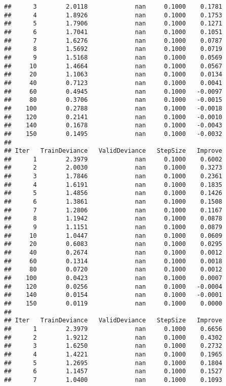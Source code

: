 \documentclass[]{article}
\begin{document}
\begin{verbatim}
##      3        2.0118             nan     0.1000    0.1781
##      4        1.8926             nan     0.1000    0.1753
##      5        1.7906             nan     0.1000    0.1271
##      6        1.7041             nan     0.1000    0.1051
##      7        1.6276             nan     0.1000    0.0787
##      8        1.5692             nan     0.1000    0.0719
##      9        1.5168             nan     0.1000    0.0569
##     10        1.4664             nan     0.1000    0.0567
##     20        1.1063             nan     0.1000    0.0134
##     40        0.7123             nan     0.1000    0.0041
##     60        0.4945             nan     0.1000   -0.0097
##     80        0.3706             nan     0.1000   -0.0015
##    100        0.2788             nan     0.1000   -0.0018
##    120        0.2141             nan     0.1000   -0.0010
##    140        0.1678             nan     0.1000   -0.0043
##    150        0.1495             nan     0.1000   -0.0032
## 
## Iter   TrainDeviance   ValidDeviance   StepSize   Improve
##      1        2.3979             nan     0.1000    0.6002
##      2        2.0030             nan     0.1000    0.3273
##      3        1.7846             nan     0.1000    0.2361
##      4        1.6191             nan     0.1000    0.1835
##      5        1.4856             nan     0.1000    0.1426
##      6        1.3861             nan     0.1000    0.1508
##      7        1.2806             nan     0.1000    0.1167
##      8        1.1942             nan     0.1000    0.0878
##      9        1.1151             nan     0.1000    0.0879
##     10        1.0447             nan     0.1000    0.0609
##     20        0.6083             nan     0.1000    0.0295
##     40        0.2674             nan     0.1000    0.0012
##     60        0.1314             nan     0.1000    0.0018
##     80        0.0720             nan     0.1000    0.0012
##    100        0.0423             nan     0.1000    0.0007
##    120        0.0256             nan     0.1000   -0.0004
##    140        0.0154             nan     0.1000   -0.0001
##    150        0.0119             nan     0.1000    0.0000
## 
## Iter   TrainDeviance   ValidDeviance   StepSize   Improve
##      1        2.3979             nan     0.1000    0.6656
##      2        1.9212             nan     0.1000    0.4302
##      3        1.6250             nan     0.1000    0.2732
##      4        1.4221             nan     0.1000    0.1965
##      5        1.2695             nan     0.1000    0.1804
##      6        1.1457             nan     0.1000    0.1527
##      7        1.0400             nan     0.1000    0.1093

\end{verbatim}
\end{document}
